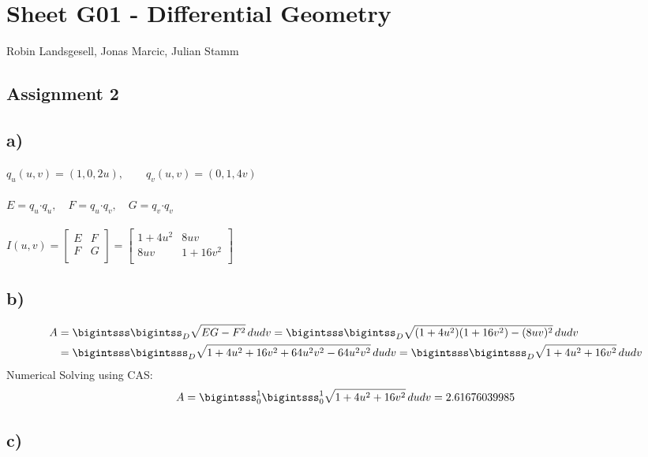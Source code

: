 \documentclass{article}
\begin{document}
\section{Sheet G01 - Differential Geometry}
Robin Landsgesell, Jonas Marcic, Julian Stamm

\subsection*{Assignment 2}

\subsection*{a)}
	$q_u(u,v) = (1, 0, 2u), \qquad q_v(u,v) = (0, 1, 4v)$\\
	\\
	$E = q_u\boldsymbol{\cdot} q_u, \quad F = q_u\boldsymbol{\cdot} q_v, \quad G = q_v\boldsymbol{\cdot} q_v$\\
	\\
	$I(u,v)= \left [
	\begin{array}{cc}
		E & F \\
		F & G \\
	\end{array}
	\right ] = 
	\left [
	\begin{array}{cc}
		1 + 4u^2 & 8uv \\
		8uv & 1 + 16v^2 \\
	\end{array}
	\right ] $
	
\subsection*{b)}

	\begin{align*}
		A &= \bigintsss\bigintss_D \sqrt{EG-F^2}\,dudv = \bigintsss\bigintss_D \sqrt{(1 + 4u^2)(1 + 16v^2)-(8uv)^2}\,dudv\\
		  &= \bigintsss\bigintsss_D \sqrt{1 + 4u^2 + 16v^2 + 64u^2v^2 - 64u^2v^2}\,dudv = \bigintsss\bigintsss_D \sqrt{1 + 4u^2 + 16v^2}\,dudv
	\end{align*}
	Numerical Solving using CAS:\\
	\begin{align*}
	A = \bigintsss_0^1\bigintsss_0^1 \sqrt{1 + 4u^2 + 16v^2}\,dudv = 2.61676039985 
	\end{align*}

\subsection*{c)}
\end{document}
